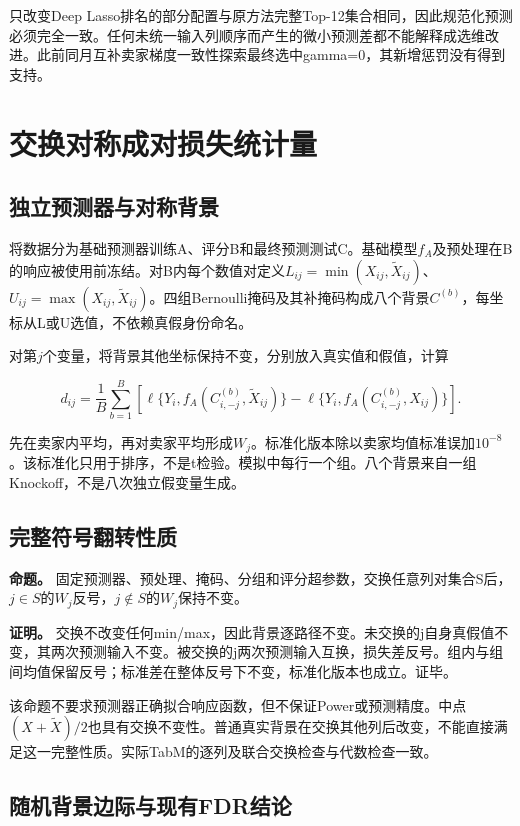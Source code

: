 \documentclass[UTF8,11pt,a4paper]{ctexart}
\begin{document}
只改变Deep Lasso排名的部分配置与原方法完整Top-12集合相同，因此规范化预测必须完全一致。任何未统一输入列顺序而产生的微小预测差都不能解释成选维改进。此前同月互补卖家梯度一致性探索最终选中gamma=0，其新增惩罚没有得到支持。

\section{交换对称成对损失统计量}

\subsection{独立预测器与对称背景}

将数据分为基础预测器训练A、评分B和最终预测测试C。基础模型\(f_A\)及预处理在B的响应被使用前冻结。对B内每个数值对定义\(L_{ij}=\min(X_{ij},\widetilde X_{ij})\)、\(U_{ij}=\max(X_{ij},\widetilde X_{ij})\)。四组Bernoulli掩码及其补掩码构成八个背景\(C^{(b)}\)，每坐标从L或U选值，不依赖真假身份命名。

对第\(j\)个变量，将背景其他坐标保持不变，分别放入真实值和假值，计算

\[
d_{ij}=\frac1B\sum_{b=1}^{B}
\left[\ell\{Y_i,f_A(C^{(b)}_{i,-j},\widetilde X_{ij})\}
-\ell\{Y_i,f_A(C^{(b)}_{i,-j},X_{ij})\}\right].
\]

先在卖家内平均，再对卖家平均形成\(W_j\)。标准化版本除以卖家均值标准误加\(10^{-8}\)。该标准化只用于排序，不是t检验。模拟中每行一个组。八个背景来自一组Knockoff，不是八次独立假变量生成。

\subsection{完整符号翻转性质}

\textbf{命题。} 固定预测器、预处理、掩码、分组和评分超参数，交换任意列对集合S后，\(j\in S\)的\(W_j\)反号，\(j\notin S\)的\(W_j\)保持不变。

\textbf{证明。} 交换不改变任何min/max，因此背景逐路径不变。未交换的j自身真假值不变，其两次预测输入不变。被交换的j两次预测输入互换，损失差反号。组内与组间均值保留反号；标准差在整体反号下不变，标准化版本也成立。证毕。

该命题不要求预测器正确拟合响应函数，但不保证Power或预测精度。中点\((X+\widetilde X)/2\)也具有交换不变性。普通真实背景在交换其他列后改变，不能直接满足这一完整性质。实际TabM的逐列及联合交换检查与代数检查一致。

\subsection{随机背景边际与现有FDR结论}
\end{document}
